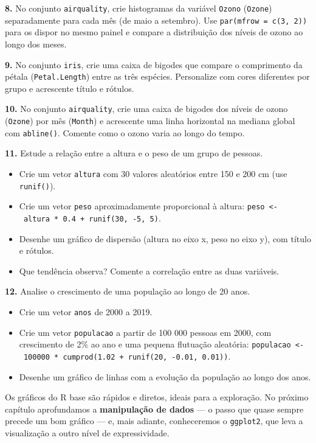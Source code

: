 \documentclass[
  portuguese,
  11pt,
  openany]{book}
\providecommand{\tightlist}{%
  \setlength{\itemsep}{0pt}\setlength{\parskip}{0pt}}
\begin{document}
\textbf{8.} No conjunto \texttt{airquality}, crie histogramas da variável \texttt{Ozono} (\texttt{Ozone})
separadamente para cada mês (de maio a setembro). Use \texttt{par(mfrow\ =\ c(3,\ 2))} para os
dispor no mesmo painel e compare a distribuição dos níveis de ozono ao longo dos meses.

\textbf{9.} No conjunto \texttt{iris}, crie uma caixa de bigodes que compare o comprimento da
pétala (\texttt{Petal.Length}) entre as três espécies. Personalize com cores diferentes por
grupo e acrescente título e rótulos.

\textbf{10.} No conjunto \texttt{airquality}, crie uma caixa de bigodes dos níveis de ozono
(\texttt{Ozone}) por mês (\texttt{Month}) e acrescente uma linha horizontal na mediana global com
\texttt{abline()}. Comente como o ozono varia ao longo do tempo.

\textbf{11.} Estude a relação entre a altura e o peso de um grupo de pessoas.

\begin{itemize}
\tightlist
\item
  Crie um vetor \texttt{altura} com 30 valores aleatórios entre 150 e 200 cm (use \texttt{runif()}).
\item
  Crie um vetor \texttt{peso} aproximadamente proporcional à altura:
  \texttt{peso\ \textless{}-\ altura\ *\ 0.4\ +\ runif(30,\ -5,\ 5)}.
\item
  Desenhe um gráfico de dispersão (altura no eixo x, peso no eixo y), com título e
  rótulos.
\item
  Que tendência observa? Comente a correlação entre as duas variáveis.
\end{itemize}

\textbf{12.} Analise o crescimento de uma população ao longo de 20 anos.

\begin{itemize}
\tightlist
\item
  Crie um vetor \texttt{anos} de 2000 a 2019.
\item
  Crie um vetor \texttt{populacao} a partir de 100 000 pessoas em 2000, com crescimento de 2\%
  ao ano e uma pequena flutuação aleatória:
  \texttt{populacao\ \textless{}-\ 100000\ *\ cumprod(1.02\ +\ runif(20,\ -0.01,\ 0.01))}.
\item
  Desenhe um gráfico de linhas com a evolução da população ao longo dos anos.
\end{itemize}

Os gráficos do R base são rápidos e diretos, ideais para a exploração. No próximo
capítulo aprofundamos a \textbf{manipulação de dados} --- o passo que quase sempre precede um
bom gráfico --- e, mais adiante, conheceremos o \texttt{ggplot2}, que leva a visualização a
outro nível de expressividade.
\end{document}
